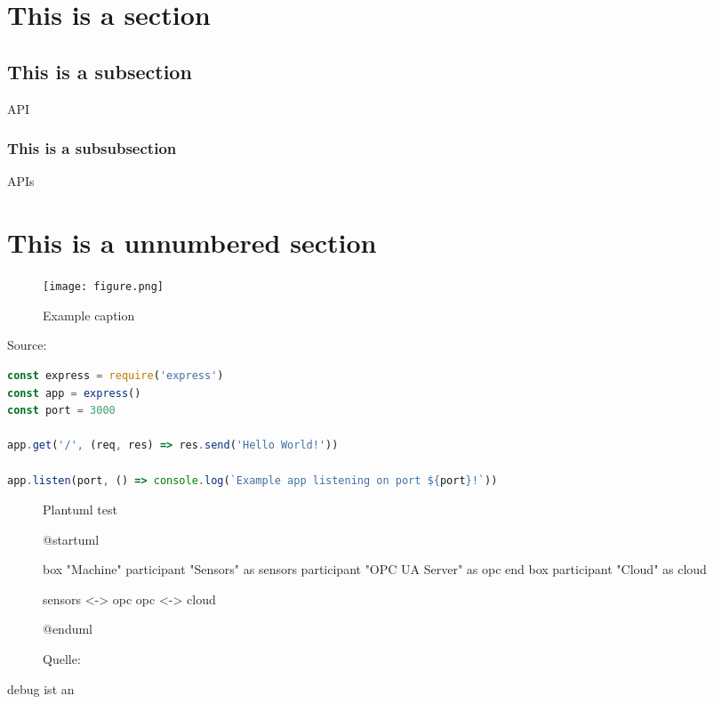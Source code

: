 
\section{This is a section}
\blindtext {}
\subsection{This is a subsection}
\blindtext \ac{API}
\subsubsection{This is a subsubsection}
\blindtext \acp{API}
\section*{This is a unnumbered section}

\begin{figure}[ht] 
    \centering
    \caption{Example caption}
    \texttt{[image: figure.png]} 
    \label{fig:goodreference}
\end{figure}

\blindtext

\begin{subcaptionenv}{Source: }
    \begin{lstlisting}[caption={Express Example}, language=javascript]
const express = require('express')
const app = express()
const port = 3000

app.get('/', (req, res) => res.send('Hello World!'))

app.listen(port, () => console.log(`Example app listening on port ${port}!`))
    \end{lstlisting}
\end{subcaptionenv}

\blindtext

\begin{figure}[h]
    \centering
    \caption{Plantuml test}
    \begin{plantuml}
        @startuml

        box "Machine"
            participant "Sensors" as sensors
            participant "OPC UA Server" as opc
        end box
        participant "Cloud" as cloud

        sensors <-> opc
        opc <-> cloud

        @enduml    
    \end{plantuml}
    \caption*{\footnotesize{Quelle: }}
    \label{fig:plantuml_test}
\end{figure}

\ifdebug{}debug ist an\fi